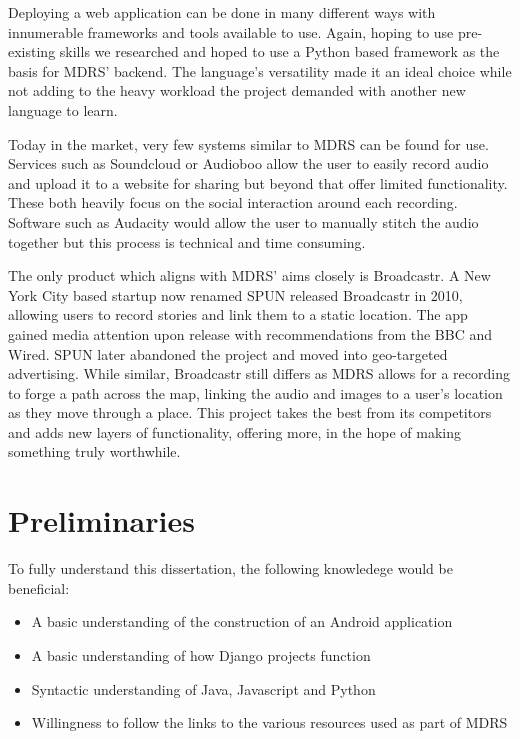 \documentclass{l3proj}
\begin{document}
Deploying a web application can be done in many different ways with innumerable frameworks and tools available to use. Again, hoping to use pre-existing skills we researched and hoped to use a \gls{Python} based framework as the basis for MDRS’ backend.  The language's versatility made it an ideal choice while not adding to the heavy workload the project demanded with another new language to learn.

Today in the market, very few systems similar to MDRS can be found for use. Services such as Soundcloud or Audioboo allow the user to easily record audio and upload it to a website for sharing but beyond that offer limited functionality. These both heavily focus on the social interaction around each recording. Software such as Audacity would allow the user to manually stitch the audio together but this process is technical and time consuming.

The only product which aligns with MDRS' aims closely is Broadcastr. A New York City based startup now renamed SPUN released Broadcastr in 2010, allowing users to record stories and link them to a static location. The app gained media attention upon release with recommendations from the BBC and Wired. SPUN later abandoned the project and moved into geo-targeted advertising. While similar, Broadcastr still differs as MDRS allows for a recording to forge a path across the map, linking the audio and images to a user’s location as they move through a place. This project takes the best from its competitors and adds new layers of functionality, offering more, in the hope of making something truly worthwhile.

\section{Preliminaries}
To fully understand this dissertation, the following knowledege would be beneficial:
\begin{itemize}
\item A basic understanding of the construction of an Android application
\item A basic understanding of how \gls{Django} projects function
\item Syntactic understanding of Java, Javascript and Python
\item Willingness to follow the links to the various resources used as part of MDRS
\end{itemize}

\end{document}
